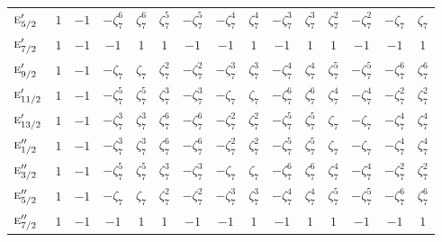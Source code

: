\documentclass[10pt,a4paper]{article}
\numberwithin{equation}{section}
\newcommand{\irr}[1]{\text{\normalfont\scshape #1}}
\newcommand{\rootunity}[1]{\zeta_{#1}}
\begin{document}
{\begin{longtable}{@{}lcccccccccccccc@{}}
$\irr{e}_{5/2}'$ & $1$ & $-1$ & $-\rootunity{7}^{6}$ & $\rootunity{7}^{6}$ & $\rootunity{7}^{5}$ & $-\rootunity{7}^{5}$ & $-\rootunity{7}^{4}$ & $\rootunity{7}^{4}$ & $-\rootunity{7}^{3}$ & $\rootunity{7}^{3}$ & $\rootunity{7}^{2}$ & $-\rootunity{7}^{2}$ & $-\rootunity{7}$ & $\rootunity{7}$\\
$\irr{e}_{7/2}'$ & $1$ & $-1$ & $-1$ & $1$ & $1$ & $-1$ & $-1$ & $1$ & $-1$ & $1$ & $1$ & $-1$ & $-1$ & $1$\\
$\irr{e}_{9/2}'$ & $1$ & $-1$ & $-\rootunity{7}$ & $\rootunity{7}$ & $\rootunity{7}^{2}$ & $-\rootunity{7}^{2}$ & $-\rootunity{7}^{3}$ & $\rootunity{7}^{3}$ & $-\rootunity{7}^{4}$ & $\rootunity{7}^{4}$ & $\rootunity{7}^{5}$ & $-\rootunity{7}^{5}$ & $-\rootunity{7}^{6}$ & $\rootunity{7}^{6}$\\
$\irr{e}_{11/2}'$ & $1$ & $-1$ & $-\rootunity{7}^{5}$ & $\rootunity{7}^{5}$ & $\rootunity{7}^{3}$ & $-\rootunity{7}^{3}$ & $-\rootunity{7}$ & $\rootunity{7}$ & $-\rootunity{7}^{6}$ & $\rootunity{7}^{6}$ & $\rootunity{7}^{4}$ & $-\rootunity{7}^{4}$ & $-\rootunity{7}^{2}$ & $\rootunity{7}^{2}$\\
$\irr{e}_{13/2}'$ & $1$ & $-1$ & $-\rootunity{7}^{3}$ & $\rootunity{7}^{3}$ & $\rootunity{7}^{6}$ & $-\rootunity{7}^{6}$ & $-\rootunity{7}^{2}$ & $\rootunity{7}^{2}$ & $-\rootunity{7}^{5}$ & $\rootunity{7}^{5}$ & $\rootunity{7}$ & $-\rootunity{7}$ & $-\rootunity{7}^{4}$ & $\rootunity{7}^{4}$\\
$\irr{e}_{1/2}''$ & $1$ & $-1$ & $-\rootunity{7}^{3}$ & $\rootunity{7}^{3}$ & $\rootunity{7}^{6}$ & $-\rootunity{7}^{6}$ & $-\rootunity{7}^{2}$ & $\rootunity{7}^{2}$ & $-\rootunity{7}^{5}$ & $\rootunity{7}^{5}$ & $\rootunity{7}$ & $-\rootunity{7}$ & $-\rootunity{7}^{4}$ & $\rootunity{7}^{4}$\\
$\irr{e}_{3/2}''$ & $1$ & $-1$ & $-\rootunity{7}^{5}$ & $\rootunity{7}^{5}$ & $\rootunity{7}^{3}$ & $-\rootunity{7}^{3}$ & $-\rootunity{7}$ & $\rootunity{7}$ & $-\rootunity{7}^{6}$ & $\rootunity{7}^{6}$ & $\rootunity{7}^{4}$ & $-\rootunity{7}^{4}$ & $-\rootunity{7}^{2}$ & $\rootunity{7}^{2}$\\
$\irr{e}_{5/2}''$ & $1$ & $-1$ & $-\rootunity{7}$ & $\rootunity{7}$ & $\rootunity{7}^{2}$ & $-\rootunity{7}^{2}$ & $-\rootunity{7}^{3}$ & $\rootunity{7}^{3}$ & $-\rootunity{7}^{4}$ & $\rootunity{7}^{4}$ & $\rootunity{7}^{5}$ & $-\rootunity{7}^{5}$ & $-\rootunity{7}^{6}$ & $\rootunity{7}^{6}$\\
$\irr{e}_{7/2}''$ & $1$ & $-1$ & $-1$ & $1$ & $1$ & $-1$ & $-1$ & $1$ & $-1$ & $1$ & $1$ & $-1$ & $-1$ & $1$\\

\end{longtable}}
\end{document}
